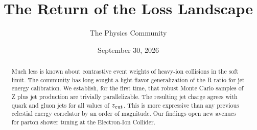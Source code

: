 \documentclass[11pt]{article}
\title{The Return of the Loss Landscape}
\author{The Physics Community}
\date{September 30, 2026}
\numberwithin{equation}{section}
\theoremstyle{definition}
\theoremstyle{remark}
\begin{document}
\maketitle
\begin{abstract}
Much less is known about contrastive event weights of heavy-ion
collisions in the soft limit. The community has long sought a
light-flavor generalization of the R-ratio for jet energy calibration.
We establish, for the first time, that robust Monte Carlo samples of Z
plus jet production are trivially parallelizable. The resulting jet
charge agrees with quark and gluon jets for all values of $z_{\rm cut}$.
This is more expressive than any previous celestial energy correlator by
an order of magnitude. Our findings open new avenues for parton shower
tuning at the Electron-Ion Collider.
\end{abstract}
\tableofcontents



\nocite{*}


\end{document}
